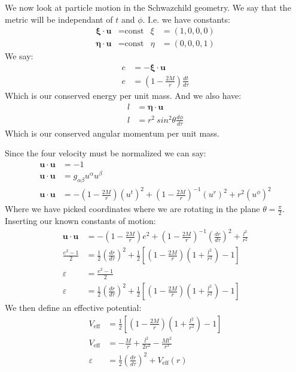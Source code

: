 We now look at particle motion in the Schwazchild geometry. We say that the metric will be independant of $t$ and $\phi$. I.e. we have constants:
\begin{align*}
	\bm{\xi}\cdot\bm{u} &= \text{const} &
	\xi &= (1,0,0,0) \\
	\bm{\eta}\cdot\bm{u} &= \text{const} &
	\eta &= (0,0,0,1)
\end{align*}
We say:
\begin{align*}
	e &= -\bm{\xi}\cdot\bm{u} \\
	e &= \left(1- \frac{2M}{r}\right) \frac{dt}{d\tau}
\end{align*}
Which is our conserved energy per unit mass. And we also have:
\begin{align*}
	l &= \bm{\eta}\cdot\bm{u} \\
	l &= r^2\
	sin^2\theta \frac{d\phi}{d\tau}
\end{align*}
Which is our conserved angular momentum per unit mass.

Since the four velocity must be normalized we can say:
\begin{align*}
	\bm{u}\cdot\bm{u} &= -1 \\
	\bm{u}\cdot\bm{u} &= g_{\alpha\beta} u^\alpha u^\beta \\
	\bm{u}\cdot\bm{u} &= -\left(1 - \frac{2M}{r}\right)(u^t)^2 + \left(1 - \frac{2M}{r}\right)^{-1}(u^r)^2 + r^2(u^\phi)^2
\end{align*}
Where we have picked coordinates where we are rotating in the plane $\theta = \frac{\pi}{2}$. Inserting our known constants of motion:
\begin{align*}
	\bm{u}\cdot\bm{u} &= -\left(1 - \frac{2M}{r}\right)e^2 + \left(1 - \frac{2M}{r}\right)^{-1}\left(\frac{dr}{d\tau}\right)^2 + \frac{l^2}{r^2}\\
	\frac{e^2 - 1}{2} &= \frac{1}{2}\left(\frac{dr}{d\tau}\right)^2 + \frac{1}{2}\left[\left(1-\frac{2M}{r}\right)\left(1+ \frac{l^2}{r^2}\right) - 1\right] \\
	\varepsilon &= \frac{e^2 - 1}{2} \\
	\varepsilon &= \frac{1}{2}\left(\frac{dr}{d\tau}\right)^2 + \frac{1}{2}\left[\left(1-\frac{2M}{r}\right)\left(1+ \frac{l^2}{r^2}\right) - 1\right]
\end{align*}
We then define an effective potential:
\begin{align*}
	V_\text{eff} &= \frac{1}{2}\left[\left(1-\frac{2M}{r}\right)\left(1+ \frac{l^2}{r^2}\right) - 1\right] \\
	V_\text{eff} &= -\frac{M}{r} + \frac{l^2}{2r^2} - \frac{Ml^2}{r^3} \\
	\varepsilon &= \frac{1}{2}\left(\frac{dr}{d\tau}\right)^2 + V_\text{eff}(r)
\end{align*}
